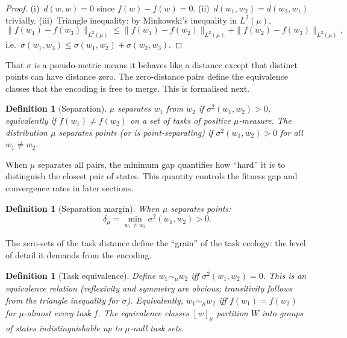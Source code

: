\documentclass[12pt]{article}
\newtheorem{definition}[theorem]{Definition}
\newcommand{\dmu}{\delta_\mu}
\newcommand{\sigmasq}{\sigma^2}
\begin{document}
\begin{proof}
(i)~$d(w, w) = 0$ since $f(w) - f(w) = 0$. (ii)~$d(w_1, w_2) = d(w_2, w_1)$ trivially. (iii)~Triangle inequality: by Minkowski's inequality in $L^2(\mu)$,
\[
\|f(w_1) - f(w_3)\|_{L^2(\mu)} \le \|f(w_1) - f(w_2)\|_{L^2(\mu)} + \|f(w_2) - f(w_3)\|_{L^2(\mu)},
\]
i.e.\ $\sigma(w_1, w_3) \le \sigma(w_1, w_2) + \sigma(w_2, w_3)$.
\end{proof}

That $\sigma$ is a pseudo-metric means it behaves like a distance except that distinct points can have distance zero. The zero-distance pairs define the equivalence classes that the encoding is free to merge. This is formalised next.

\begin{definition}[Separation]\label{def:separation}
$\mu$ \emph{separates} $w_1$ from $w_2$ if $\sigmasq(w_1, w_2) > 0$, equivalently if $f(w_1) \ne f(w_2)$ on a set of tasks of positive $\mu$-measure. The distribution $\mu$ \emph{separates points} (or is \emph{point-separating}) if $\sigmasq(w_1, w_2) > 0$ for all $w_1 \ne w_2$.
\end{definition}

When $\mu$ separates all pairs, the minimum gap quantifies how ``hard'' it is to distinguish the closest pair of states. This quantity controls the fitness gap and convergence rates in later sections.

\begin{definition}[Separation margin]\label{def:margin}
When $\mu$ separates points:
\begin{equation}\label{eq:margin}
\dmu = \min_{w_1 \ne w_2} \sigmasq(w_1, w_2) > 0.
\end{equation}
\end{definition}

The zero-sets of the task distance define the ``grain'' of the task ecology: the level of detail it demands from the encoding.

\begin{definition}[Task equivalence]\label{def:task-equiv}
Define $w_1 \sim_\mu w_2$ iff $\sigmasq(w_1, w_2) = 0$. This is an equivalence relation (reflexivity and symmetry are obvious; transitivity follows from the triangle inequality for $\sigma$). Equivalently, $w_1 \sim_\mu w_2$ iff $f(w_1) = f(w_2)$ for $\mu$-almost every task $f$. The equivalence classes $[w]_\mu$ partition $W$ into groups of states indistinguishable up to $\mu$-null task sets.
\end{definition}
\end{document}
